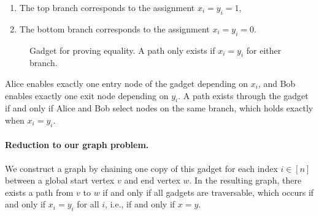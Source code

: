 \begin{enumerate}
    \item The top branch corresponds to the assignment $x_i = y_i = 1$, 
    \item The bottom branch corresponds to the assignment $x_i = y_i = 0$. 
\end{enumerate}
 

\begin{figure}[h]
\centering
{}
\caption{Gadget for proving equality. A path only exists if $x_i = y_i$ for either branch.}
\label{fig:equality_gadget}
\end{figure}


Alice enables exactly one entry node of the gadget depending on $x_i$, and Bob enables exactly one exit node depending on $y_i$. A path exists through the gadget if and only if Alice and Bob select nodes on the same branch, which holds exactly when $x_i = y_i$.\\

\paragraph{Reduction to our graph problem.}
We construct a graph by chaining one copy of this gadget for each index $i \in [n]$ between a global start vertex $v$ and end vertex $w$. In the resulting graph, there exists a path from $v$ to $w$ if and only if all gadgets are traversable, which occurs if and only if $x_i = y_i$ for all $i$, i.e., if and only if $x = y$.


